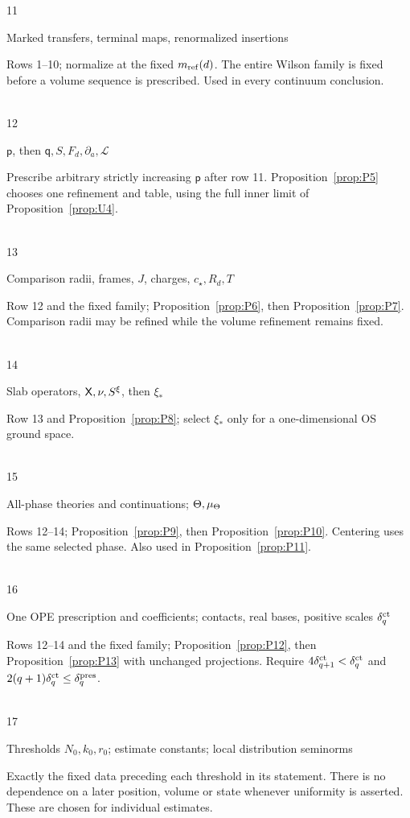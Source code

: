 \begin{tabbing}
11\>\parbox[t]{0.26\linewidth}{\raggedright Marked transfers, terminal maps, renormalized insertions}\>\parbox[t]{0.67\linewidth}{\raggedright Rows 1--10; normalize at the fixed $m_{\mathrm{ref}}(d)$. The entire Wilson family is fixed before a volume sequence is prescribed. Used in every continuum conclusion.}\\[0.45em]
12\>\parbox[t]{0.26\linewidth}{\raggedright $\mathsf p$, then $\mathsf q,S,F_d,\partial_a,\mathcal L$}\>\parbox[t]{0.67\linewidth}{\raggedright Prescribe arbitrary strictly increasing $\mathsf p$ after row 11. Proposition~\ref{prop:P5} chooses one refinement and table, using the full inner limit of Proposition~\ref{prop:U4}.}\\[0.45em]
13\>\parbox[t]{0.26\linewidth}{\raggedright Comparison radii, frames, $J$, charges, $c_\star,R_d,T$}\>\parbox[t]{0.67\linewidth}{\raggedright Row 12 and the fixed family; Proposition~\ref{prop:P6}, then Proposition~\ref{prop:P7}. Comparison radii may be refined while the volume refinement remains fixed.}\\[0.45em]
14\>\parbox[t]{0.26\linewidth}{\raggedright Slab operators, $\mathsf{X},\nu,S^\xi$, then $\xi_*$}\>\parbox[t]{0.67\linewidth}{\raggedright Row 13 and Proposition~\ref{prop:P8}; select $\xi_*$ only for a one-dimensional OS ground space.}\\[0.45em]
15\>\parbox[t]{0.26\linewidth}{\raggedright All-phase theories and continuations; $\Theta,\mu_{\Theta}$}\>\parbox[t]{0.67\linewidth}{\raggedright Rows 12--14; Proposition~\ref{prop:P9}, then Proposition~\ref{prop:P10}. Centering uses the same selected phase. Also used in Proposition~\ref{prop:P11}.}\\[0.45em]
16\>\parbox[t]{0.26\linewidth}{\raggedright One OPE prescription and coefficients; contacts, real bases, positive scales $\delta_q^{\rm ct}$}\>\parbox[t]{0.67\linewidth}{\raggedright Rows 12--14 and the fixed family; Proposition~\ref{prop:P12}, then Proposition~\ref{prop:P13} with unchanged projections. Require $4\delta_{q+1}^{\rm ct}<\delta_q^{\rm ct}$ and $2(q+1)\delta_q^{\rm ct}\le\delta_q^{\rm pres}$.}\\[0.45em]
17\>\parbox[t]{0.26\linewidth}{\raggedright Thresholds $N_0,k_0,r_0$; estimate constants; local distribution seminorms}\>\parbox[t]{0.67\linewidth}{\raggedright Exactly the fixed data preceding each threshold in its statement. There is no dependence on a later position, volume or state whenever uniformity is asserted. These are chosen for individual estimates.}\\
\end{tabbing}
\endgroup

